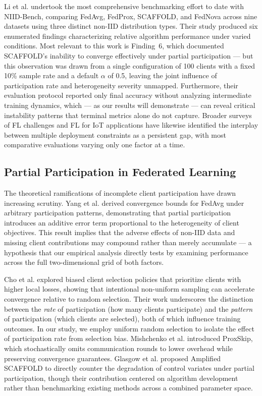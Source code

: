 \documentclass[conference]{IEEEtran}
\begin{document}
Li et al. \cite{li2022niid} undertook the most comprehensive benchmarking effort to date with NIID-Bench, comparing FedAvg, FedProx, SCAFFOLD, and FedNova across nine datasets using three distinct non-IID distribution types. Their study produced six enumerated findings characterizing relative algorithm performance under varied conditions. Most relevant to this work is Finding~6, which documented SCAFFOLD's inability to converge effectively under partial participation --- but this observation was drawn from a single configuration of 100 clients with a fixed 10\% sample rate and a default $\alpha$ of 0.5, leaving the joint influence of participation rate and heterogeneity severity unmapped. Furthermore, their evaluation protocol reported only final accuracy without analyzing intermediate training dynamics, which --- as our results will demonstrate --- can reveal critical instability patterns that terminal metrics alone do not capture. Broader surveys of FL challenges \cite{wen2023survey} and FL for IoT applications \cite{nguyen2021iot} have likewise identified the interplay between multiple deployment constraints as a persistent gap, with most comparative evaluations varying only one factor at a time.

\subsection{Partial Participation in Federated Learning}

The theoretical ramifications of incomplete client participation have drawn increasing scrutiny. Yang et al. \cite{yang2021partial} derived convergence bounds for FedAvg under arbitrary participation patterns, demonstrating that partial participation introduces an additive error term proportional to the heterogeneity of client objectives. This result implies that the adverse effects of non-IID data and missing client contributions may compound rather than merely accumulate --- a hypothesis that our empirical analysis directly tests by examining performance across the full two-dimensional grid of both factors.

Cho et al. \cite{cho2023power} explored biased client selection policies that prioritize clients with higher local losses, showing that intentional non-uniform sampling can accelerate convergence relative to random selection. Their work underscores the distinction between the \textit{rate} of participation (how many clients participate) and the \textit{pattern} of participation (which clients are selected), both of which influence training outcomes. In our study, we employ uniform random selection to isolate the effect of participation rate from selection bias. Mishchenko et al. \cite{mishchenko2022proxskip} introduced ProxSkip, which stochastically omits communication rounds to lower overhead while preserving convergence guarantees. Glasgow et al. \cite{glasgow2024amplified} proposed Amplified SCAFFOLD to directly counter the degradation of control variates under partial participation, though their contribution centered on algorithm development rather than benchmarking existing methods across a combined parameter space.
\end{document}
